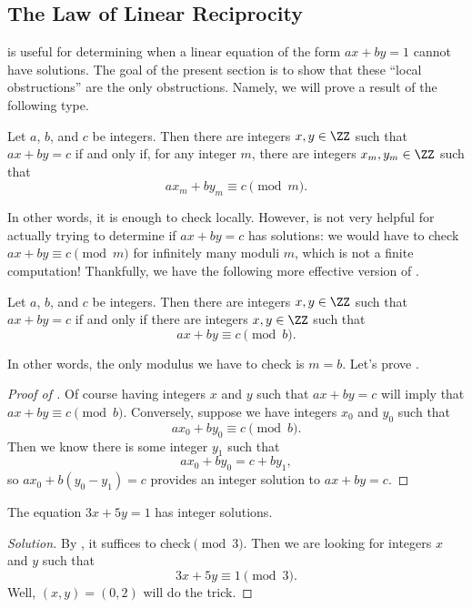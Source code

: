 \documentclass[../notes.tex]{subfiles}
\begin{document}
\subsection{The Law of Linear Reciprocity}
 is useful for determining when a linear equation of the form $ax+by=1$ cannot have solutions. The goal of the present section is to show that these ``local obstructions'' are the only obstructions. Namely, we will prove a result of the following type.
\begin{prop} \label{prop:bezout-as-local-to-global}
	Let $a$, $b$, and $c$ be integers. Then there are integers $x,y\in\ZZ$ such that $ax+by=c$ if and only if, for any integer $m$, there are integers $x_m,y_m\in\ZZ$ such that
	\[ax_m+by_m\equiv c\pmod m.\]
\end{prop}
In other words, it is enough to check locally. However,  is not very helpful for actually trying to determine if $ax+by=c$ has solutions: we would have to check $ax+by\equiv c\pmod m$ for infinitely many moduli $m$, which is not a finite computation! Thankfully, we have the following more effective version of .
\begin{prop} \label{prop:bezout-as-local-to-global-2}
	Let $a$, $b$, and $c$ be integers. Then there are integers $x,y\in\ZZ$ such that $ax+by=c$ if and only if there are integers $x,y\in\ZZ$ such that
	\[ax+by\equiv c\pmod b.\]
\end{prop}
In other words, the only modulus we have to check is $m=b$. Let's prove .
\begin{proof}[Proof of ]
	Of course having integers $x$ and $y$ such that $ax+by=c$ will imply that $ax+by\equiv c\pmod b$. Conversely, suppose we have integers $x_0$ and $y_0$ such that
	\[ax_0+by_0\equiv c\pmod b.\]
	Then we know there is some integer $y_1$ such that
	\[ax_0+by_0=c+by_1,\]
	so $ax_0+b(y_0-y_1)=c$ provides an integer solution to $ax+by=c$.
\end{proof}
\begin{example}
	The equation $3x+5y=1$ has integer solutions.
\end{example}
\begin{proof}[Solution]
	By , it suffices to check$\pmod3$. Then we are looking for integers $x$ and $y$ such that
	\[3x+5y\equiv1\pmod3.\]
	Well, $(x,y)=(0,2)$ will do the trick.
\end{proof}
\end{document}
